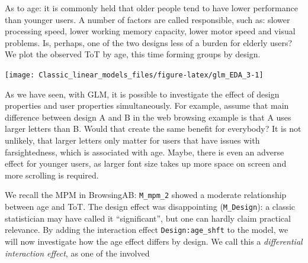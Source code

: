 \documentclass[]{svmono}
\newenvironment{Shaded}{\begin{snugshade}}{\end{snugshade}}
\newcommand{\KeywordTok}[1]{\textcolor[rgb]{0.13,0.29,0.53}{\textbf{#1}}}
\newcommand{\DataTypeTok}[1]{\textcolor[rgb]{0.13,0.29,0.53}{#1}}
\newcommand{\StringTok}[1]{\textcolor[rgb]{0.31,0.60,0.02}{#1}}
\newcommand{\OperatorTok}[1]{\textcolor[rgb]{0.81,0.36,0.00}{\textbf{#1}}}
\newcommand{\NormalTok}[1]{#1}
\begin{document}
As to age: it is commonly held that older people tend to have lower
performance than younger users. A number of factors are called
responsible, such as: slower processing speed, lower working memory
capacity, lower motor speed and visual problems. Is, perhaps, one of the
two designs less of a burden for elderly users? We plot the observed ToT
by age, this time forming groups by design.

\begin{Shaded}
\end{Shaded}

\texttt{[image: Classic\_linear\_models\_files/figure-latex/glm\_EDA\_3-1]}

As we have seen, with GLM, it is possible to investigate the effect of
design properties and user properties simultaneously. For example,
assume that main difference between design A and B in the web browsing
example is that A uses larger letters than B. Would that create the same
benefit for everybody? It is not unlikely, that larger letters only
matter for users that have issues with farsightedness, which is
associated with age. Maybe, there is even an adverse effect for younger
users, as larger font size takes up more space on screen and more
scrolling is required.

We recall the MPM in BrowsingAB: \texttt{M\_mpm\_2} showed a moderate
relationship between age and ToT. The design effect was disappointing
(\texttt{M\_Design}): a classic statistician may have called it
``significant'', but one can hardly claim practical relevance. By adding
the interaction effect \texttt{Design:age\_shft} to the model, we will
now investigate how the age effect differs by design. We call this a
\emph{differential interaction effect}, as one of the involved
\end{document}
